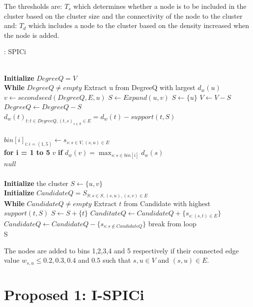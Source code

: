 \documentclass[10pt]{extarticle}
\begin{document}
	The thresholds are: $T_s$ which determines whether a node is to be included in the cluster based on the cluster size and the connectivity of the node to the cluster and: $T_d$ which includes a node to the cluster based on the density increased when the node is added.
	\begin{algorithm}
		\caption{: SPICi}\label{spicicode}
		\begin{algorithmic}[1]
			 \\
			\textbf{Initialize} $DegreeQ = V$ \\
			\textbf{While} $DegreeQ \neq empty$
			\State Extract u from DegreeQ with largest $d_w(u)$
			\State $v \gets secondseed(DegreeQ,E,u)$
			 $S \gets Expand(u,v)$
			\EndIf
			\Else 
				\State $S \gets \{u\}$
			\EndIf
			\State $V \gets V - S $
			\State $Degree Q \gets Degree Q - S$
			\State $d_w(t)_{t:t\in DegreeQ,(t,s)_{s\in S}\in E} = d_w(t) - support(t,S)$
			\EndProcedure\\
			 \\
			$bin[i]_{i:i=(1,5)} \gets s_{s:s\in V,(s,u)\in E}$ \\
			\textbf{for i = 1 to 5}
				\State \Return $v$ \textbf{if} $d_w(v)=\max_{s:s\in bin[i]}{d_w(s)}$
			\EndIf\\
			\Return $null$
			\EndProcedure\\
			\\
			\textbf{Initialize} the cluster $S \gets \{u,v\}$ \\
			\textbf{Initialize} $CandidateQ = S_{S:s\in S,(s,u),(s,v)\in E}$\\
			\textbf{While} $CandidateQ \neq empty$
			\State Extract $t$ from Candidate with highest $support(t,S)$
				\State $S\gets S+\{t\}$
				\State $CanditateQ \gets CandidateQ + \{s_{s:(s,t)\in E}\}$
				\State $CandidateQ \gets CandidateQ - \{s_{s:s\not\in CandidateQ}\}$
				\Else
				\State break from loop
				\EndIf \\
				\Return S
			\EndProcedure
		\end{algorithmic}
	\end{algorithm}
	The nodes are added to bins 1,2,3,4 and 5 respectively if their connected edge value $w_{s,u}\leq0.2,0.3,0.4$ and $0.5$ such that $s,u\in V$ and $(s,u)\in E$.
	
	
	\section{Proposed 1: I-SPICi} \label{algo:ispici}
	
\end{document}
